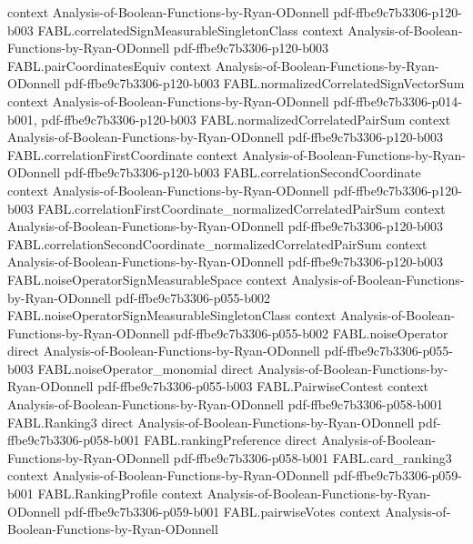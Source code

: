 \begin{theorem}
  {context}
  {Analysis-of-Boolean-Functions-by-Ryan-ODonnell}
  {pdf-ffbe9c7b3306-p120-b003}
\proofstep
  {FABL.correlatedSignMeasurableSingletonClass}
  {context}
  {Analysis-of-Boolean-Functions-by-Ryan-ODonnell}
  {pdf-ffbe9c7b3306-p120-b003}
\proofstep
  {FABL.pairCoordinatesEquiv}
  {context}
  {Analysis-of-Boolean-Functions-by-Ryan-ODonnell}
  {pdf-ffbe9c7b3306-p120-b003}
\proofstep
  {FABL.normalizedCorrelatedSignVectorSum}
  {context}
  {Analysis-of-Boolean-Functions-by-Ryan-ODonnell}
  {pdf-ffbe9c7b3306-p014-b001,
    pdf-ffbe9c7b3306-p120-b003}
\proofstep
  {FABL.normalizedCorrelatedPairSum}
  {context}
  {Analysis-of-Boolean-Functions-by-Ryan-ODonnell}
  {pdf-ffbe9c7b3306-p120-b003}
\proofstep
  {FABL.correlationFirstCoordinate}
  {context}
  {Analysis-of-Boolean-Functions-by-Ryan-ODonnell}
  {pdf-ffbe9c7b3306-p120-b003}
\proofstep
  {FABL.correlationSecondCoordinate}
  {context}
  {Analysis-of-Boolean-Functions-by-Ryan-ODonnell}
  {pdf-ffbe9c7b3306-p120-b003}
\proofstep
  {FABL.correlationFirstCoordinate_normalizedCorrelatedPairSum}
  {context}
  {Analysis-of-Boolean-Functions-by-Ryan-ODonnell}
  {pdf-ffbe9c7b3306-p120-b003}
\proofstep
  {FABL.correlationSecondCoordinate_normalizedCorrelatedPairSum}
  {context}
  {Analysis-of-Boolean-Functions-by-Ryan-ODonnell}
  {pdf-ffbe9c7b3306-p120-b003}
\proofstep
  {FABL.noiseOperatorSignMeasurableSpace}
  {context}
  {Analysis-of-Boolean-Functions-by-Ryan-ODonnell}
  {pdf-ffbe9c7b3306-p055-b002}
\proofstep
  {FABL.noiseOperatorSignMeasurableSingletonClass}
  {context}
  {Analysis-of-Boolean-Functions-by-Ryan-ODonnell}
  {pdf-ffbe9c7b3306-p055-b002}
\proofstep
  {FABL.noiseOperator}
  {direct}
  {Analysis-of-Boolean-Functions-by-Ryan-ODonnell}
  {pdf-ffbe9c7b3306-p055-b003}
\proofstep
  {FABL.noiseOperator_monomial}
  {direct}
  {Analysis-of-Boolean-Functions-by-Ryan-ODonnell}
  {pdf-ffbe9c7b3306-p055-b003}
\proofstep
  {FABL.PairwiseContest}
  {context}
  {Analysis-of-Boolean-Functions-by-Ryan-ODonnell}
  {pdf-ffbe9c7b3306-p058-b001}
\proofstep
  {FABL.Ranking3}
  {direct}
  {Analysis-of-Boolean-Functions-by-Ryan-ODonnell}
  {pdf-ffbe9c7b3306-p058-b001}
\proofstep
  {FABL.rankingPreference}
  {direct}
  {Analysis-of-Boolean-Functions-by-Ryan-ODonnell}
  {pdf-ffbe9c7b3306-p058-b001}
\proofstep
  {FABL.card_ranking3}
  {context}
  {Analysis-of-Boolean-Functions-by-Ryan-ODonnell}
  {pdf-ffbe9c7b3306-p059-b001}
\proofstep
  {FABL.RankingProfile}
  {context}
  {Analysis-of-Boolean-Functions-by-Ryan-ODonnell}
  {pdf-ffbe9c7b3306-p059-b001}
\proofstep
  {FABL.pairwiseVotes}
  {context}
  {Analysis-of-Boolean-Functions-by-Ryan-ODonnell}

\end{theorem}
